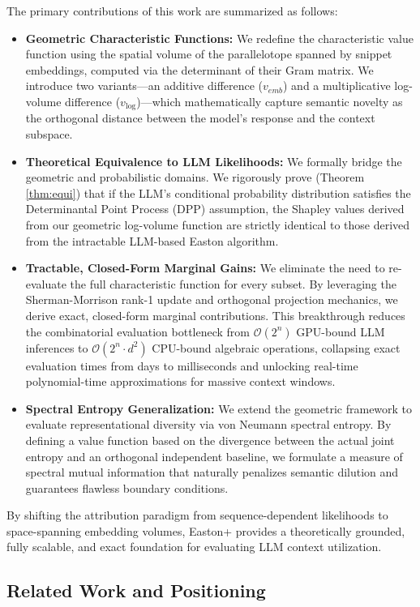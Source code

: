 \documentclass{article}
\begin{document}
The primary contributions of this work are summarized as follows:
\begin{itemize}
    \item \textbf{Geometric Characteristic Functions:} We redefine the characteristic value function using the spatial volume of the parallelotope spanned by snippet embeddings, computed via the determinant of their Gram matrix. We introduce two variants---an additive difference ($v_{emb}$) and a multiplicative log-volume difference ($v_{\log}$)---which mathematically capture semantic novelty as the orthogonal distance between the model's response and the context subspace.
    \item \textbf{Theoretical Equivalence to LLM Likelihoods:} We formally bridge the geometric and probabilistic domains. We rigorously prove (Theorem \ref{thm:equi}) that if the LLM's conditional probability distribution satisfies the Determinantal Point Process (DPP) assumption, the Shapley values derived from our geometric log-volume function are strictly identical to those derived from the intractable LLM-based Easton algorithm.
    \item \textbf{Tractable, Closed-Form Marginal Gains:} We eliminate the need to re-evaluate the full characteristic function for every subset. By leveraging the Sherman-Morrison rank-1 update and orthogonal projection mechanics, we derive exact, closed-form marginal contributions. This breakthrough reduces the combinatorial evaluation bottleneck from $\mathcal{O}(2^n)$ GPU-bound LLM inferences to $\mathcal{O}(2^n \cdot d^2)$ CPU-bound algebraic operations, collapsing exact evaluation times from days to milliseconds and unlocking real-time polynomial-time approximations for massive context windows.
    \item \textbf{Spectral Entropy Generalization:} We extend the geometric framework to evaluate representational diversity via von Neumann spectral entropy. By defining a value function based on the divergence between the actual joint entropy and an orthogonal independent baseline, we formulate a measure of spectral mutual information that naturally penalizes semantic dilution and guarantees flawless boundary conditions.
\end{itemize}

By shifting the attribution paradigm from sequence-dependent likelihoods to space-spanning embedding volumes, Easton+ provides a theoretically grounded, fully scalable, and exact foundation for evaluating LLM context utilization.

\subsection{Related Work and Positioning}
\end{document}
